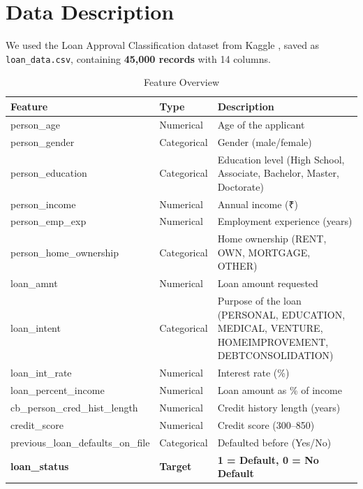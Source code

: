 \documentclass[12pt, a4paper]{article}
\begin{document}
\section{Data Description}

We used the Loan Approval Classification dataset from Kaggle \cite{kaggle_dataset}, saved as \texttt{loan\_data.csv}, containing \textbf{45,000 records} with 14 columns.

\begin{table}[H]
  \centering
  \caption{Feature Overview}
  \begin{tabular}{l l p{7cm}}
    \toprule
    \textbf{Feature} & \textbf{Type} & \textbf{Description} \\
    \midrule
    person\_age             & Numerical   & Age of the applicant \\
    person\_gender          & Categorical & Gender (male/female) \\
    person\_education       & Categorical & Education level (High School, Associate, Bachelor, Master, Doctorate) \\
    person\_income          & Numerical   & Annual income (₹) \\
    person\_emp\_exp        & Numerical   & Employment experience (years) \\
    person\_home\_ownership & Categorical & Home ownership (RENT, OWN, MORTGAGE, OTHER) \\
    loan\_amnt              & Numerical   & Loan amount requested \\
    loan\_intent            & Categorical & Purpose of the loan (PERSONAL, EDUCATION, MEDICAL, VENTURE, HOMEIMPROVEMENT, DEBTCONSOLIDATION) \\
    loan\_int\_rate         & Numerical   & Interest rate (\%) \\
    loan\_percent\_income   & Numerical   & Loan amount as \% of income \\
    cb\_person\_cred\_hist\_length & Numerical & Credit history length (years) \\
    credit\_score           & Numerical   & Credit score (300--850) \\
    previous\_loan\_defaults\_on\_file & Categorical & Defaulted before (Yes/No) \\
    \midrule
    \textbf{loan\_status}   & \textbf{Target} & \textbf{1 = Default, 0 = No Default} \\
    \bottomrule
  \end{tabular}
\end{table}
\end{document}
